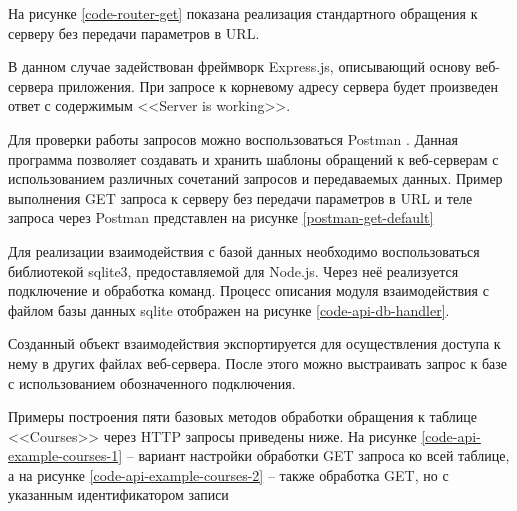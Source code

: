 На рисунке \ref{code-router-get} показана реализация стандартного обращения к серверу без передачи параметров в URL.


В данном случае задействован фреймворк Express.js, описывающий основу веб-сервера приложения.
При запросе к корневому адресу сервера будет произведен ответ с содержимым <<Server is working>>.

Для проверки работы запросов можно воспользоваться Postman \cite{postman}.
Данная программа позволяет создавать и хранить шаблоны обращений к веб-серверам с использованием различных сочетаний запросов и передаваемых данных.
Пример выполнения GET запроса к серверу без передачи параметров в URL и теле запроса через Postman представлен на рисунке \ref{postman-get-default}


Для реализации взаимодействия с базой данных необходимо воспользоваться библиотекой sqlite3, предоставляемой для Node.js.
Через неё реализуется подключение и обработка команд.
Процесс описания модуля взаимодействия с файлом базы данных sqlite отображен на рисунке \ref{code-api-db-handler}.


Созданный объект взаимодействия экспортируется для осуществления доступа к нему в других файлах веб-сервера.
После этого можно выстраивать запрос к базе с использованием обозначенного подключения.

Примеры построения пяти базовых методов обработки обращения к таблице <<Courses>> через HTTP запросы приведены ниже.
На рисунке \ref{code-api-example-courses-1} -- вариант настройки обработки GET запроса ко всей таблице, а на рисунке \ref{code-api-example-courses-2} -- также обработка GET, но с указанным идентификатором записи



